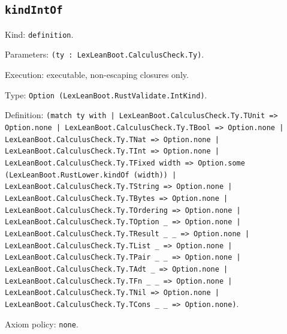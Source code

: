 \documentclass[11pt]{article}
\begin{document}
\subsection*{\texttt{kindIntOf}}
\noindent Kind: \texttt{definition}.\par
\noindent Parameters: \texttt{(ty : LexLeanBoot.CalculusCheck.Ty)}.\par
\noindent Execution: executable, non-escaping closures only.\par
\noindent Type: \texttt{Option (LexLeanBoot.RustValidate.IntKind)}.\par
\noindent Definition: \texttt{(match ty with | LexLeanBoot.CalculusCheck.Ty.TUnit => Option.none | LexLeanBoot.CalculusCheck.Ty.TBool => Option.none | LexLeanBoot.CalculusCheck.Ty.TNat => Option.none | LexLeanBoot.CalculusCheck.Ty.TInt => Option.none | LexLeanBoot.CalculusCheck.Ty.TFixed width => Option.some (LexLeanBoot.RustLower.kindOf (width)) | LexLeanBoot.CalculusCheck.Ty.TString => Option.none | LexLeanBoot.CalculusCheck.Ty.TBytes => Option.none | LexLeanBoot.CalculusCheck.Ty.TOrdering => Option.none | LexLeanBoot.CalculusCheck.Ty.TOption \_ => Option.none | LexLeanBoot.CalculusCheck.Ty.TResult \_ \_ => Option.none | LexLeanBoot.CalculusCheck.Ty.TList \_ => Option.none | LexLeanBoot.CalculusCheck.Ty.TPair \_ \_ => Option.none | LexLeanBoot.CalculusCheck.Ty.TAdt \_ => Option.none | LexLeanBoot.CalculusCheck.Ty.TFn \_ \_ => Option.none | LexLeanBoot.CalculusCheck.Ty.TNil => Option.none | LexLeanBoot.CalculusCheck.Ty.TCons \_ \_ => Option.none)}.\par
\noindent Axiom policy: \texttt{none}.\par
\end{document}
